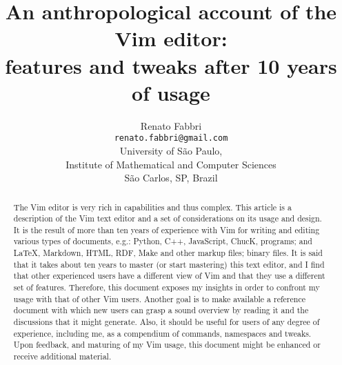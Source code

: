 \documentclass{article}
\begin{document}
\title{An anthropological account of the Vim editor:\\
features and tweaks after 10 years of usage}
\author{Renato Fabbri\\
\texttt{renato.fabbri@gmail.com}\\
University of São Paulo,\\
Institute of Mathematical and Computer Sciences\\
São Carlos, SP, Brazil
}
\maketitle
\begin{abstract}
The Vim editor is very rich in capabilities
and thus complex.
This article is a description of the Vim text editor
and a set of considerations on its usage and design.
It is the result of more than ten years of experience
with Vim for writing and editing various types of documents,
e.g.:
Python, C++, JavaScript, ChucK, programs;
and \LaTeX, Markdown, HTML, RDF, Make and other markup files;
binary files.
It is said that it takes about ten years to master (or start mastering)
this text editor, and I find that other experienced users
have a different view of Vim and that they use a different
set of features.
Therefore, this document exposes my insights in order
to confront my usage with that of other Vim users.
Another goal is
to make available a reference document with which new users
can grasp a sound overview by reading it and the discussions that
it might generate.
Also, it should be useful for users of any degree of experience,
including me, as a compendium of commands, namespaces and tweaks.
Upon feedback, and maturing of my Vim usage,
this document might be enhanced or receive additional
material.
\end{abstract}
\end{document}
